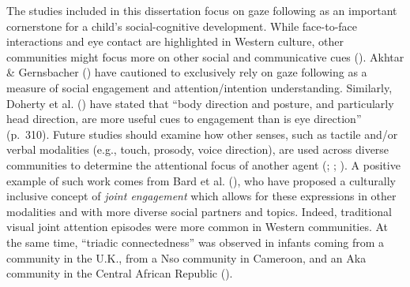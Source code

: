\documentclass[
]{scrbook}
\begin{document}
The studies included in this dissertation focus on gaze following as an important cornerstone for a child's social-cognitive development. While face-to-face interactions and eye contact are highlighted in Western culture, other communities might focus more on other social and communicative cues (). Akhtar \& Gernsbacher () have cautioned to exclusively rely on gaze following as a measure of social engagement and attention/intention understanding. Similarly, Doherty et al. () have stated that ``body direction and posture, and particularly head direction, are more useful cues to engagement than is eye direction'' (p.~310). Future studies should examine how other senses, such as tactile and/or verbal modalities (e.g., touch, prosody, voice direction), are used across diverse communities to determine the attentional focus of another agent (; ; ). A positive example of such work comes from Bard et al. (), who have proposed a culturally inclusive concept of \emph{joint engagement} which allows for these expressions in other modalities and with more diverse social partners and topics. Indeed, traditional visual joint attention episodes were more common in Western communities. At the same time, ``triadic connectedness'' was observed in infants coming from a community in the U.K., from a Nso community in Cameroon, and an Aka community in the Central African Republic ().
\end{document}
